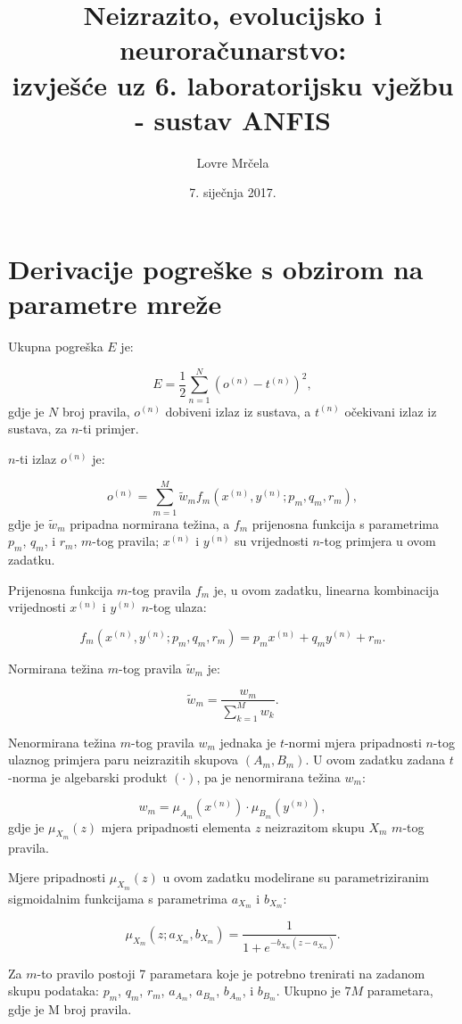 \documentclass[12pt, a4paper]{article}
\title{Neizrazito, evolucijsko i neuroračunarstvo:\\
  izvješće uz 6. laboratorijsku vježbu - sustav ANFIS}
\author{Lovre Mrčela}
\date{7. siječnja 2017.}
\begin{document}
\maketitle

\section*{Derivacije pogreške s obzirom na parametre mreže}

Ukupna pogreška $E$ je:

$$ E = \dfrac{1}{2} \sum_{n=1}^{N} \left( o^{(n)} - t^{(n)} \right)^2, $$
gdje je $N$ broj pravila, $o^{(n)}$ dobiveni izlaz iz sustava, a $t^{(n)}$ očekivani izlaz iz sustava, za $n$-ti primjer.

$n$-ti izlaz $o^{(n)}$ je:

$$ o^{(n)} = \sum_{m=1}^{M} \widetilde{w}_m f_m \left( x^{(n)}, y^{(n)}; p_m, q_m, r_m \right), $$
gdje je $\widetilde{w}_m$ pripadna normirana težina, a $f_m$ prijenosna funkcija s parametrima $p_m$, $q_m$, i $r_m$, $m$-tog pravila; $x^{(n)}$ i $y^{(n)}$ su vrijednosti $n$-tog primjera u ovom zadatku.

Prijenosna funkcija $m$-tog pravila $f_m$ je, u ovom zadatku, linearna kombinacija vrijednosti $x^{(n)}$ i $y^{(n)}$ $n$-tog ulaza:

$$ f_m \left( x^{(n)}, y^{(n)}; p_m, q_m, r_m \right) = p_m x^{(n)} + q_m y^{(n)} + r_m. $$


Normirana težina $m$-tog pravila $\widetilde{w}_m$ je:

$$ \widetilde{w}_m = \dfrac{w_m}{\sum_{k=1}^{M} w_k}. $$

Nenormirana težina $m$-tog pravila $w_m$ jednaka je $t$-normi mjera pripadnosti $n$-tog ulaznog primjera paru neizrazitih skupova $(A_m, B_m)$. U ovom zadatku zadana $t$-norma je algebarski produkt $\left( \cdot \right)$, pa je nenormirana težina $w_m$:

$$ w_m = \mu_{A_m} \left( x^{(n)} \right) \cdot \mu_{B_m} \left( y^{(n)} \right), $$
gdje je $\mu_{X_m} \left( z \right)$ mjera pripadnosti elementa $z$ neizrazitom skupu $X_m$ $m$-tog pravila.

Mjere pripadnosti $\mu_{X_m} \left( z \right)$ u ovom zadatku modelirane su parametriziranim sigmoidalnim funkcijama s parametrima $a_{X_m}$ i $b_{X_m}$:

$$ \mu_{X_m} \left( z; a_{X_m}, b_{X_m} \right) = \dfrac{1}{1 + e^{-b_{X_m} \left( z - a_{X_m} \right)}}. $$

Za $m$-to pravilo postoji 7 parametara koje je potrebno trenirati na zadanom skupu podataka: $p_m$, $q_m$, $r_m$, $a_{A_m}$, $a_{B_m}$, $b_{A_m}$, i $b_{B_m}$. Ukupno je $7 M$ parametara, gdje je M broj pravila.
\end{document}
